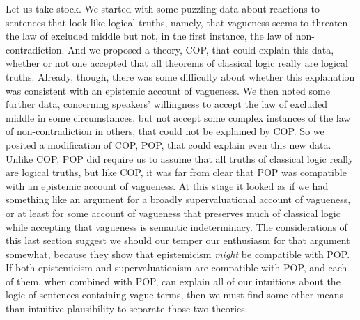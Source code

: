 Let us take stock. We started with some puzzling data about reactions to sentences that look like logical truths, namely, that vagueness seems to threaten the law of excluded middle but not, in the first instance, the law of non-contradiction. And we proposed a theory, COP, that could explain this data, whether or not one accepted that all theorems of classical logic really are logical truths. Already, though, there was some difficulty about whether this explanation was consistent with an epistemic account of vagueness. We then noted some further data, concerning speakers' willingness to accept the law of excluded middle in some circumstances, but not accept some complex instances of the law of non-contradiction in others, that could not be explained by COP. So we posited a modification of COP, POP, that could explain even this new data. Unlike COP, POP did require us to assume that all truths of classical logic really are logical truths, but like COP, it was far from clear that POP was compatible with an epistemic account of vagueness. At this stage it looked as if we had something like an argument for a broadly supervaluational account of vagueness, or at least for some account of vagueness that preserves much of classical logic while accepting that vagueness is semantic indeterminacy. The considerations of this last section suggest we should our temper our enthusiasm for that argument somewhat, because they show that epistemicism \textit{might} be compatible with POP. If both epistemicism and supervaluationism are compatible with POP, and each of them, when combined with POP, can explain all of our intuitions about the logic of sentences containing vague terms, then we must find some other means than intuitive plausibility to separate those two theories.

